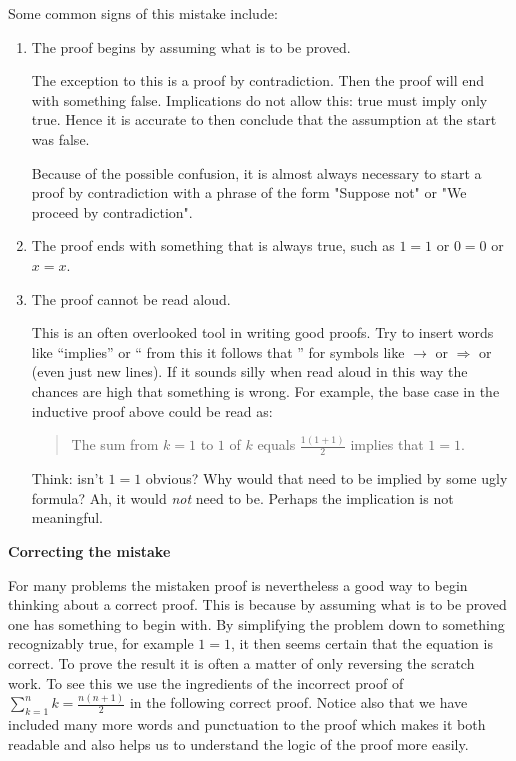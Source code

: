 \documentclass[12pt]{article}
\begin{document}
Some common signs of this mistake include:
\begin{enumerate}
\item The proof begins by assuming what is to be proved.  

The exception to this is a 
proof by contradiction.  Then the proof will end with something false.  
Implications do not allow this: true must imply only true.  Hence it is accurate
to then conclude that the assumption at the start was false.  

Because of the possible confusion, it is almost always necessary to start a proof by contradiction
with a phrase of the form "Suppose not" or "We proceed by contradiction".

\item The proof ends with something that is always true, such as $1=1$ or $0=0$ or $x=x$.

\item The proof cannot be read aloud.

This is an often overlooked tool in writing good proofs.  Try to insert words like ``implies''
or `` from this it follows that '' for symbols like $\rightarrow$  or $\Rightarrow$ or (even just new lines).
If it sounds silly when read aloud in this way the chances are high that something is wrong.
For example, the base case in the inductive proof above could be read as:
\begin{quote}
The sum from $k=1$ to $1$ of $k$ equals $\frac{1(1+1)}{2}$ implies that $1=1$.
\end{quote}
Think: isn't $1=1$ obvious?  Why would that need to be implied by some ugly formula?  Ah, it 
would \emph{not} need to be.  Perhaps the implication is not meaningful.
\end{enumerate}

\noindent\textbf{Correcting the mistake}

For many problems the mistaken proof is nevertheless a good way to begin thinking about a correct proof.
This is because by assuming what is to be proved one has something to begin with.  By simplifying the
problem down to something recognizably true, for example $1=1$, it then seems certain that the equation
is correct.  To prove the result it is often a matter of only reversing the scratch work.  To see this
we use the ingredients of the incorrect proof of $\sum_{k=1}^n k = \frac{n(n+1)}{2}$ in the following correct
proof.  Notice also that we have included many more words and punctuation to the proof which makes it
both readable and also helps us to understand the logic of the proof more easily.
\end{document}
